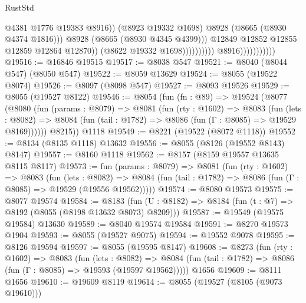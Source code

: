 \begin{lexlean}{RustStd}
\begin{coremodule}
                                                        @4381
                                                        @1776
                                                        @19383
                                                        @8916))
                                                    (@8923 @19332 @1698)
                                                    @8928
                                                    (@8665 (@8930 @4374 @1816)))
                                                  @8928
                                                  (@8665 (@8930 @4345 @4399)))
                                                @12849
                                                @12852
                                                @12855
                                                @12859
                                                @12864
                                                @12870))
                                            (@8622 @19332 @1698))))))))))
                          @8916)))))))))))
@19516 := @16846 @19515
@19517 := @8038 @547
@19521 := @8040 (@8044 @547) (@8050 @547)
@19522 := @8059 @13629
@19524 := @8055 (@19522 @8074)
@19526 := @8097 (@8098 @547)
@19527 := @8093 @19526
@19529 := @8055 (@19527 @8122)
@19546 := @8054
    (fun (fn : @89) =>
    @19524
      (@8077
        (@8080
          (fun (params : @8079) =>
          @8081
            (fun (rty : @1602) =>
            @8083
              (fun (lets : @8082) =>
              @8084 (fun (tail : @1782) => @8086 (fun (Γ : @8085) => @19529 @8169))))))
        @8215))
    @1118
@19549 := @8221 (@19522 (@8072 @1118))
@19552 := @8134 (@8135 @1118) @13632
@19556 := @8055 (@8126 (@19552 @8143) @8147)
@19557 := @8160 @1118
@19562 := @8157 (@8159 @19557 @13635 @8115 @8117)
@19573 := fun (params : @8079) =>
  @8081
    (fun (rty : @1602) =>
    @8083
      (fun (lets : @8082) =>
      @8084 (fun (tail : @1782) => @8086 (fun (Γ : @8085) => @19529 (@19556 @19562)))))
@19574 := @8080 @19573
@19575 := @8077 @19574
@19584 := @8183
    (fun (U : @8182) => @8184 (fun (t : @7) => @8192 (@8055 (@8198 @13632 @8073) @8209)))
@19587 := @19549 (@19575 @19584) @13630
@19589 := @8040 @19574 @19584
@19591 := @8270 @19573 @1904
@19593 := @8055 (@19527 @9075)
@19594 := @19552 @9078
@19595 := @8126 @19594
@19597 := @8055 (@19595 @8147)
@19608 := @8273
    (fun (rty : @1602) =>
    @8083
      (fun (lets : @8082) =>
      @8084 (fun (tail : @1782) => @8086 (fun (Γ : @8085) => @19593 (@19597 @19562)))))
    @1656
@19609 := @8111 @1656
@19610 := @19609 @8119
@19614 := @8055 (@19527 (@8105 (@9073 @19610)))

\end{coremodule}
\end{lexlean}
